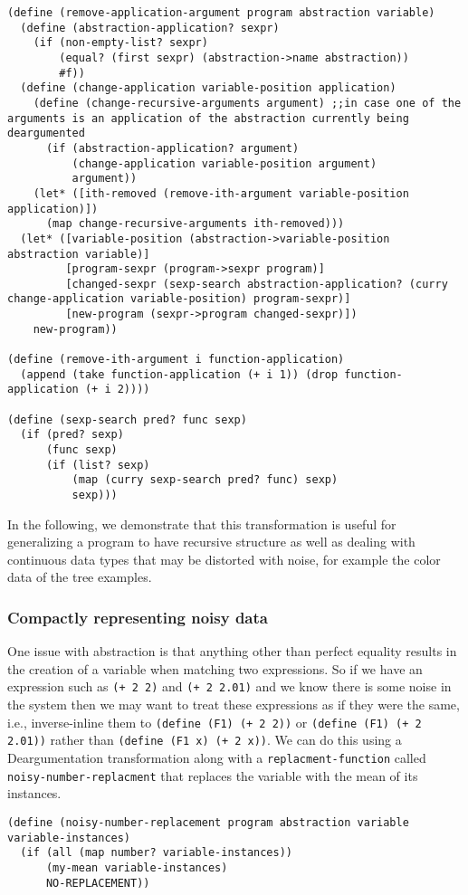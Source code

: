 \documentclass[a4paper,10pt]{article}
\begin{document}
\begin{lstlisting}[frame=trBL]
(define (remove-application-argument program abstraction variable)
  (define (abstraction-application? sexpr)
    (if (non-empty-list? sexpr)
        (equal? (first sexpr) (abstraction->name abstraction))
        #f))
  (define (change-application variable-position application)
    (define (change-recursive-arguments argument) ;;in case one of the arguments is an application of the abstraction currently being deargumented
      (if (abstraction-application? argument)
          (change-application variable-position argument)
          argument))
    (let* ([ith-removed (remove-ith-argument variable-position application)])
      (map change-recursive-arguments ith-removed)))
  (let* ([variable-position (abstraction->variable-position abstraction variable)]
         [program-sexpr (program->sexpr program)]
         [changed-sexpr (sexp-search abstraction-application? (curry change-application variable-position) program-sexpr)]
         [new-program (sexpr->program changed-sexpr)])
    new-program))

(define (remove-ith-argument i function-application)
  (append (take function-application (+ i 1)) (drop function-application (+ i 2))))

(define (sexp-search pred? func sexp)
  (if (pred? sexp)
      (func sexp)
      (if (list? sexp)
          (map (curry sexp-search pred? func) sexp)
          sexp)))
\end{lstlisting}
In the following, we demonstrate that this transformation is useful for generalizing a program to have recursive structure as well as dealing with continuous data types that may be distorted with noise, for example the color data of the tree examples.

\subsubsection{Compactly representing noisy data}
One issue with abstraction is that anything other than perfect equality results in the creation of a variable when matching two expressions.  So if we have an expression such as \texttt{(+ 2 2)} and \texttt{(+ 2 2.01)} and we know there is some noise in the system then we may want to treat these expressions as if they were the same, i.e., inverse-inline them to \texttt{(define (F1) (+ 2 2))} or \texttt{(define (F1) (+ 2 2.01))} rather than \texttt{(define (F1 x) (+ 2 x))}.  We can do this using a Deargumentation transformation along with a \texttt{replacment-function} called \texttt{noisy-number-replacment} that replaces the variable with the mean of its instances.  
\begin{lstlisting}[frame=trBL]
(define (noisy-number-replacement program abstraction variable variable-instances)
  (if (all (map number? variable-instances))
      (my-mean variable-instances)
      NO-REPLACEMENT))
\end{lstlisting}
\end{document}
